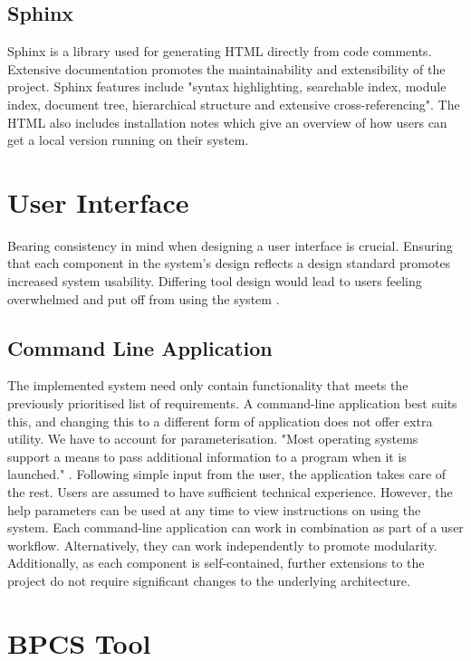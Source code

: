 \documentclass{l4proj}
\begin{document}
\subsection{Sphinx}\label{sphinx}

Sphinx \citep{sphinx} is a library used for generating HTML directly from code comments. Extensive documentation promotes the maintainability and extensibility of the project. Sphinx features include "syntax highlighting, searchable index, module index, document tree, hierarchical structure and extensive cross-referencing". The HTML also includes installation notes which give an overview of how users can get a local version running on their system.

\section{User Interface}

Bearing consistency in mind when designing a user interface is crucial.  Ensuring that each component in the system's design reflects a design standard promotes increased system usability. Differing tool design would lead to users feeling overwhelmed and put off from using the system \citep{consistency}. 

\subsection{Command Line Application} \label{command_line}

The implemented system need only contain functionality that meets the previously prioritised list of requirements. A command-line application best suits this, and changing this to a different form of application does not offer extra utility. We have to account for parameterisation. "Most operating systems support a means to pass additional information to a program when it is launched." \citep{commandline}.  Following simple input from the user, the application takes care of the rest. Users are assumed to have sufficient technical experience. However, the help parameters can be used at any time to view instructions on using the system. Each command-line application can work in combination as part of a user workflow. Alternatively, they can work independently to promote modularity. Additionally, as each component is self-contained, further extensions to the project do not require significant changes to the underlying architecture.

\section{BPCS Tool}\label{implementation_bpcs_tool}
\end{document}
